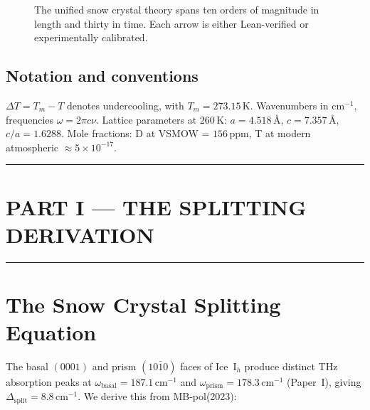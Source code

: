 \documentclass[11pt,a4paper]{article}
\begin{document}
\begin{figure}[h]
\centering
{}
\caption{The unified snow crystal theory spans ten orders of magnitude in length and thirty in time. Each arrow is either Lean-verified or experimentally calibrated.}
\label{fig:structure}
\end{figure}

\subsection{Notation and conventions}
$\Delta T = T_m - T$ denotes undercooling, with $T_m = 273.15$\,K. Wavenumbers in cm$^{-1}$, frequencies $\omega = 2\pi c \nu$. Lattice parameters at $260$\,K: $a = 4.518$\,\AA, $c = 7.357$\,\AA, $c/a = 1.6288$. Mole fractions: D at VSMOW = $156$\,ppm, T at modern atmospheric $\approx 5\times 10^{-17}$.

\hrule\vspace{14pt}

\section*{\centering PART I — THE SPLITTING DERIVATION}
\hrule\vspace{12pt}

\section{The Snow Crystal Splitting Equation}
\label{sec:splitting}

The basal $(0001)$ and prism $(10\bar{1}0)$ faces of Ice~I$_h$ produce distinct THz absorption peaks at $\omega_\text{basal} = 187.1$\,cm$^{-1}$ and $\omega_\text{prism} = 178.3$\,cm$^{-1}$ (Paper~I), giving $\Delta_\text{split} = 8.8$\,cm$^{-1}$. We derive this from MB-pol(2023):
\end{document}
